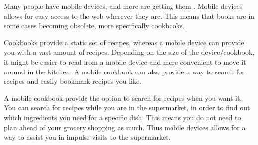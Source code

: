 Many people have mobile devices, and more are getting them . Mobile devices allows for easy access to the web wherever they are. This means that books are in some cases becoming obsolete, more specifically cookbooks.

Cookbooks provide a static set of recipes, whereas a mobile device can provide you with a vast amount of recipes. Depending on the size of the device/cookbook, it might be easier to read from a mobile device and more convenient to move it around in the kitchen. A mobile cookbook can also provide a way to search for recipes and easily bookmark recipes you like.

A mobile cookbook provide the option to search for recipes when you want it. You can search for recipes while you are in the supermarket, in order to find out which ingredients you need for a specific dish. This means you do not need to plan ahead of your grocery shopping as much. Thus mobile devices allows for a way to assist you in impulse visits to the supermarket.
